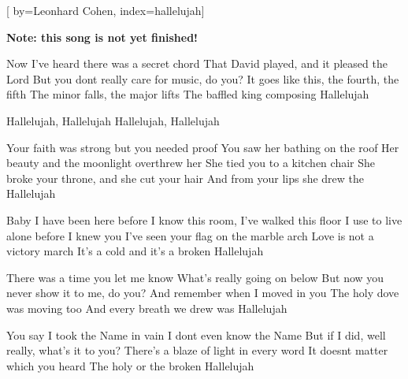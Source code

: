 

[%
    by={Leonhard Cohen},
    index={hallelujah}]


    \label{hallelujah}

    \textbf{Note: this song is not yet finished!}

    \beginverse
        Now I've heard there was a secret chord
        That David played, and it pleased the Lord
        But you dont really care for music, do you?
        It goes like this, the fourth, the fifth
        The minor falls, the major lifts
        The baffled king composing Hallelujah
    \endverse

    \beginchorus
        Hallelujah, Hallelujah
        Hallelujah, Hallelujah
    \endchorus

    \beginverse
        Your faith was strong but you needed proof
        You saw her bathing on the roof
        Her beauty and the moonlight overthrew her
        She tied you to a kitchen chair
        She broke your throne, and she cut your hair
        And from your lips she drew the Hallelujah
    \endverse


    \beginverse
        Baby I have been here before
        I know this room, I've walked this floor
        I use to live alone before I knew you
        I've seen your flag on the marble arch
        Love is not a victory march
        It's a cold and it's a broken Hallelujah
    \endverse


    \beginverse
        There was a time you let me know
        What's really going on below
        But now you never show it to me, do you?
        And remember when I moved in you
        The holy dove was moving too
        And every breath we drew was Hallelujah
    \endverse


    \beginverse
        You say I took the Name in vain
        I dont even know the Name
        But if I did, well really, what's it to you?
        There's a blaze of light in every word
        It doesnt matter which you heard
        The holy or the broken Hallelujah
    \endverse

\endsong
